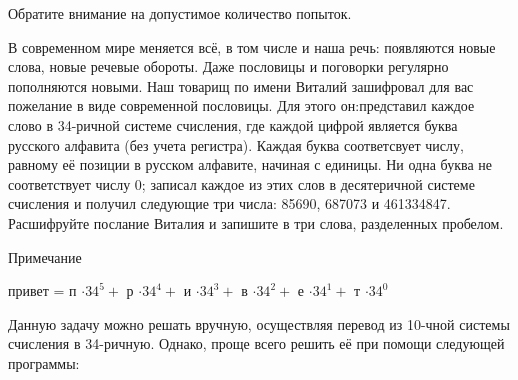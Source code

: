 
Обратите внимание на допустимое количество попыток.

В современном мире меняется всё, в том числе и наша речь: появляются новые слова, новые речевые обороты. 
Даже пословицы и поговорки регулярно пополняются новыми. Наш товарищ по имени Виталий зашифровал для вас 
пожелание в виде современной пословицы. Для этого он:представил каждое слово в 34-ричной системе счисления, 
где каждой цифрой является буква русского алфавита (без учета регистра). 
Каждая буква соответсвует числу, равному её позиции в русском алфавите, начиная с единицы. 
Ни одна буква не соответствует числу 0; записал каждое из этих слов в десятеричной системе 
счисления и получил следующие три числа: 85690, 687073 и 461334847. Расшифруйте послание Виталия и 
запишите в три слова, разделенных пробелом.

Примечание

привет = п $\cdot 34^5 +$ р $\cdot 34^4 +$ и $\cdot 34^3 +$ в $\cdot 34^2 +$ е $\cdot 34^1 +$ т $\cdot 34^0$ 

\soultionSection
Данную задачу можно решать вручную, осуществляя перевод из 10-чной системы счисления в 34-ричную. Однако, проще всего решить её при помощи следующей программы:


